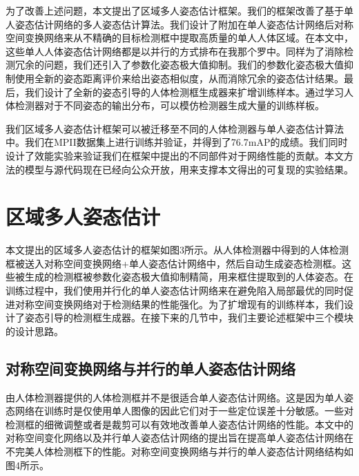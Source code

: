 为了改善上述问题，本文提出了区域多人姿态估计框架。我们的框架改善了基于单人姿态估计网络的多人姿态估计算法。我们设计了附加在单人姿态估计网络后对称空间变换网络来从不精确的目标检测框中提取高质量的单人人体区域。在本文中，这些单人人体姿态估计网络都是以并行的方式排布在我那个罗中。同样为了消除检测冗余的问题，我们还引入了参数化姿态极大值抑制。我们的参数化姿态极大值抑制使用全新的姿态距离评价来给出姿态相似度，从而消除冗余的姿态估计结果。最后，我们设计了全新的姿态引导的人体检测框生成器来扩增训练样本。通过学习人体检测器对于不同姿态的输出分布，可以模仿检测器生成大量的训练样板。

我们区域多人姿态估计框架可以被迁移至不同的人体检测器与单人姿态估计算法中。我们在MPII数据集上进行训练并验证，并得到了76.7mAP的成绩。我们同时设计了效能实验来验证我们在框架中提出的不同部件对于网络性能的贡献。本文方法的模型与源代码现在已经向公众开放，用来支撑本文得出的可复现的实验结果。

\section*{区域多人姿态估计}
本文提出的区域多人姿态估计的框架如图3所示。从人体检测器中得到的人体检测框被送入对称空间变换网络+单人姿态估计网络中，然后自动生成姿态检测框。这些被生成的检测框被参数化姿态极大值抑制精简，用来框住提取到的人体姿态。在训练过程中，我们使用并行化的单人姿态估计网络来在避免陷入局部最优的同时促进对称空间变换网络对于检测结果的性能强化。为了扩增现有的训练样本，我们设计了姿态引导的检测框生成器。在接下来的几节中，我们主要论述框架中三个模块的设计思路。
\subsection*{对称空间变换网络与并行的单人姿态估计网络}
由人体检测器提供的人体检测框并不是很适合单人姿态估计网络。这是因为单人姿态网络在训练时是仅使用单人图像的因此它们对于一些定位误差十分敏感。一些对检测框的细微调整或者是裁剪可以有效地改善单人姿态估计网络的性能。本文中的对称空间变化网络以及并行单人姿态估计网络的提出旨在提高单人姿态估计网络在不完美人体检测框下的性能。对称空间变换网络与并行的单人姿态估计网络结构如图4所示。

